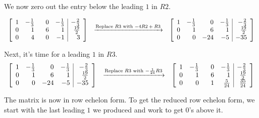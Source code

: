 \documentclass{ximera}
\begin{document}
\begin{example}
We now zero out the entry below the leading $1$ in $R2$.


\[ \begin{array}{ccc}


 \left[ \begin{array}{rrrr|r}
 1 & -\frac{1}{3} & \hphantom{-}0 & -\frac{1}{3} & -\frac{2}{3} \\  
 0 & 1 & 6 & 1 & \frac{19}{2} \\  
 0 & 4 & 0 & -1 & 3 \\  \end{array} \right]

&

\xrightarrow{\text{Replace $R3$ with $-4R2+R3$}}

&

 \left[ \begin{array}{rrrr|r}
 1 & -\frac{1}{3} & 0 & -\frac{1}{3} & -\frac{2}{3} \\  
 0 & 1 & 6 & 1 & \frac{19}{2} \\  
 0 & 0& -24 & -5 & -35 \\  \end{array} \right]

 \end{array}\]
 
Next, it's time for a leading $1$ in $R3$.
\[ \begin{array}{ccc}


 \left[ \begin{array}{rrrr|r}
 1 & -\frac{1}{3} & 0 & -\frac{1}{3} & -\frac{2}{3} \\  
 0 & 1 & 6 & 1 & \frac{19}{2} \\  
 0 & 0& -24 & -5 & -35 \\  \end{array} \right]
&

\xrightarrow{\text{Replace $R3$ with $-\frac{1}{24}R3$}}

&

 \left[ \begin{array}{rrrr|r}
 1 & -\frac{1}{3} & \hphantom{-}0 & -\frac{1}{3} & -\frac{2}{3} \\  
 0 & 1 & 6 & 1 & \frac{19}{2} \\  
 0 & 0& 1 & \frac{5}{24} & \frac{35}{24} \\  \end{array} \right]

 \end{array}\]
 
The matrix is now in row echelon form.  To get the reduced row echelon form, we start with the last leading $1$ we produced and work to get $0$'s above it.
\[ \begin{array}{ccc}


\end{array}\]
\end{example}
\end{document}
